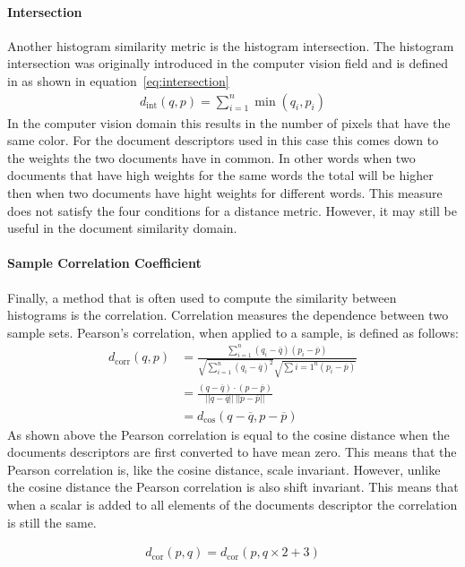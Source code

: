 \paragraph{Intersection} Another histogram similarity metric is the histogram
intersection. The histogram intersection \citep{swain1991color} was originally
introduced in the computer vision field and is defined in as shown in
equation~\ref{eq:intersection}
\begin{align}
  d_\textrm{int}(q,p) = \sum_{i=1}^n \min(q_i, p_i) \label{eq:intersection}
\end{align}
In the computer vision domain this results in the number of pixels that have
the same color. For the document descriptors used in this case this comes
down to the weights the two documents have in common. In other words when
two documents that have high weights for the same words the total will be
higher then when two documents have hight weights for different words. This
measure does not satisfy the four conditions for a distance metric. However,
it may still be useful in the document similarity domain.

\paragraph{Sample Correlation Coefficient} Finally, a method that is often used to compute the
similarity between histograms is the correlation. Correlation measures
the dependence between two sample sets. Pearson's correlation, when applied to
a sample, is defined as follows:
\begin{align}
  d_{\textrm{corr}}(q,p) &= \frac{\sum_{i=1}^n(q_i - \overline{q})(p_i - \overline{p})}{\sqrt{\sum_{i=1}^n(q_i - \overline{q})^2}\sqrt{\sum{i=1}^n(p_i - \overline{p})}} \\
    &= \frac{(q - \overline{q}) \cdot (p - \overline{p})}{||q - \overline{q}||\,||p - \overline{p}||} \\
    &= d_\textrm{cos}(q - \overline{q}, p - \overline{p})
\end{align}
As shown above the Pearson correlation is equal to the cosine distance when the 
documents descriptors are first converted to have mean zero. This means that
the Pearson correlation is, like the cosine distance, scale invariant. However,
unlike the cosine distance the Pearson correlation is also shift invariant. This
means that when a scalar is added to all elements of the documents descriptor
the correlation is still the same.

\begin{align*}
  d_\textrm{cor}(p,q) = d_\textrm{cor}(p, q\times2 + 3)
\end{align*}
